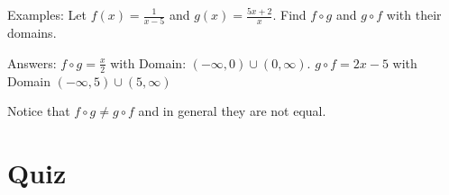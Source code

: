 \documentclass{tufte-handout}
\begin{document}
\smallskip

\noindent Examples: Let $f(x) = \frac{1}{x-5}$ and $g(x) = \frac{5x + 2}{x}$.  Find $f \circ g$ and $g \circ f$ with their domains.

Answers: $f \circ g = \frac{x}{2}$ with Domain: $(-\infty,0) \cup (0,\infty)$.  $g \circ f = 2 x - 5$ with Domain $(-\infty,5) \cup (5,\infty)$

Notice that $f \circ g \neq g \circ f$ and in general they are not equal.  

\section{Quiz}
\end{document}
